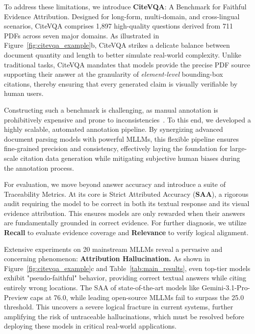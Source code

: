 \documentclass{llmxive}
\begin{document}
To address these limitations, we introduce \textbf{CiteVQA}: A Benchmark for Faithful Evidence Attribution. Designed for long-form, multi-domain, and cross-lingual scenarios, CiteVQA comprises 1,897 high-quality questions derived from 711 PDFs across seven major domains. As illustrated in Figure~\ref{fig:citevqa_example}b, CiteVQA strikes a delicate balance between document quantity and length to better simulate real-world complexity. Unlike traditional tasks, CiteVQA mandates that models provide the precise PDF source supporting their answer at the granularity of \textit{element-level} bounding-box citations, thereby ensuring that every generated claim is visually verifiable by human users.

Constructing such a benchmark is challenging, as manual annotation is prohibitively expensive and prone to inconsistencies~\citep{loison2026vidore}. To this end, we developed a highly scalable, automated annotation pipeline. By synergizing advanced document parsing models with powerful MLLMs, this flexible pipeline ensures fine-grained precision and consistency, effectively laying the foundation for large-scale citation data generation while mitigating subjective human biases during the annotation process.

For evaluation, we move beyond answer accuracy and introduce a suite of Traceability Metrics. At its core is Strict Attributed Accuracy (\textbf{SAA}), a rigorous audit requiring the model to be correct in both its textual response and its visual evidence attribution. This ensures models are only rewarded when their answers are fundamentally grounded in correct evidence. For further diagnosis, we utilize \textbf{Recall} to evaluate evidence coverage and \textbf{Relevance} to verify logical alignment.

Extensive experiments on 20 mainstream MLLMs reveal a pervasive and concerning phenomenon: \textbf{Attribution Hallucination.} As shown in Figure~\ref{fig:citevqa_example}c and Table~\ref{tab:main_results}, even top-tier models exhibit "pseudo-faithful" behavior, providing correct textual answers while citing entirely wrong locations. The SAA of state-of-the-art models like Gemini-3.1-Pro-Preview caps at 76.0, while leading open-source MLLMs fail to surpass the 25.0 threshold. This uncovers a severe logical fracture in current systems, further amplifying the risk of untraceable hallucinations, which must be resolved before deploying these models in critical real-world applications.
\end{document}
